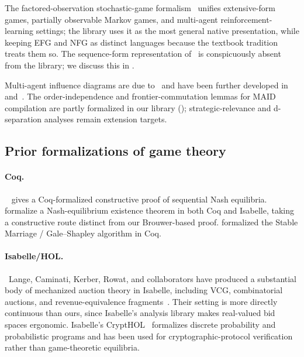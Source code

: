 The factored-observation stochastic-game
formalism~\citep{Kovarik2022} unifies extensive-form games,
partially observable Markov games, and
multi-agent reinforcement-learning settings; the library uses it
as the most general native presentation, while keeping EFG and
NFG as distinct languages because the textbook tradition treats
them so.  The sequence-form representation
of~\citet{KollerMegiddoVonStengel1994} is conspicuously absent
from the library; we discuss this in .

Multi-agent influence diagrams are due
to~\citet{KollerMilch2003} and have been further developed
in~\citet{PfefferGal2007} and~\citet{HammondEtAl2023}.  The
order-independence and frontier-commutation lemmas for MAID
compilation are partly formalized in our library
(); strategic-relevance and
d-separation analyses remain extension targets.

\subsection{Prior formalizations of game theory}
\label{sec:rw:formalization}

\paragraph{Coq.}\ \citet{Vestergaard2006} gives a Coq-formalized
constructive proof of sequential Nash equilibria.
\citet{LeRouxMartinDorelSmaus2017} formalize a Nash-equilibrium
existence theorem in both Coq and Isabelle, taking a constructive
route distinct from our Brouwer-based proof.
\citet{Bertot2016} formalized the Stable Marriage / Gale–Shapley
algorithm in Coq.

\paragraph{Isabelle/HOL.}\ Lange, Caminati, Kerber, Rowat, and
collaborators have produced a substantial body of mechanized
auction theory in Isabelle, including VCG, combinatorial
auctions, and revenue-equivalence
fragments~\citep{KerberLangeRowat2016, CaminatiKerberLangeRowat2014}.
Their setting is more directly continuous than ours, since
Isabelle's analysis library makes real-valued bid spaces
ergonomic.  Isabelle's CryptHOL~\citep{Lochbihler2016} formalizes
discrete probability and probabilistic programs and has been
used for cryptographic-protocol verification rather than
game-theoretic equilibria.

